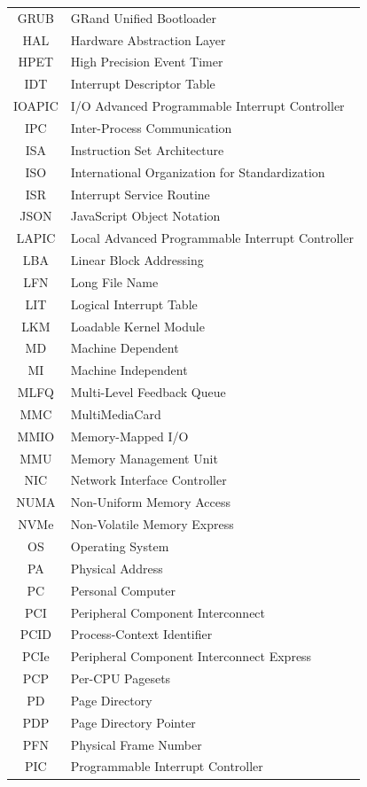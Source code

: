\documentclass[a4paper,10pt,twoside]{report}
\theoremstyle{definition}
\begin{document}
\begin{supertabular}{cl}
GRUB & GRand Unified Bootloader \\
HAL & Hardware Abstraction Layer \\
HPET & High Precision Event Timer \\
IDT & Interrupt Descriptor Table \\
IOAPIC & I/O Advanced Programmable Interrupt Controller \\
IPC & Inter-Process Communication \\
ISA & Instruction Set Architecture \\
ISO & International Organization for Standardization \\
ISR & Interrupt Service Routine \\
JSON & JavaScript Object Notation \\
LAPIC & Local Advanced Programmable Interrupt Controller \\
LBA & Linear Block Addressing \\
LFN & Long File Name \\
LIT & Logical Interrupt Table \\
LKM & Loadable Kernel Module \\
MD & Machine Dependent \\
MI & Machine Independent \\
MLFQ & Multi-Level Feedback Queue \\
MMC & MultiMediaCard \\
MMIO & Memory-Mapped I/O \\
MMU & Memory Management Unit \\
NIC & Network Interface Controller \\
NUMA & Non-Uniform Memory Access \\
NVMe & Non-Volatile Memory Express \\
OS & Operating System \\
PA & Physical Address \\
PC & Personal Computer \\
PCI & Peripheral Component Interconnect \\
PCID & Process-Context Identifier \\
PCIe & Peripheral Component Interconnect Express \\
PCP & Per-CPU Pagesets \\
PD & Page Directory \\
PDP & Page Directory Pointer \\
PFN & Physical Frame Number \\
PIC & Programmable Interrupt Controller \\

\end{supertabular}
\end{document}
